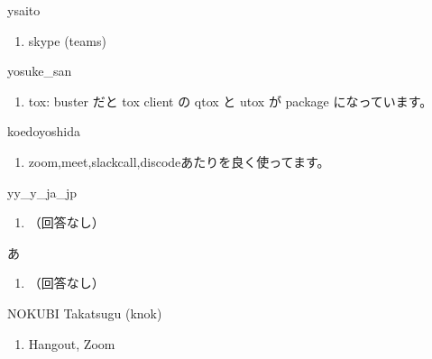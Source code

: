 \begin{prework}{ ysaito }
  \begin{enumerate}
  \item skype (teams)
  \end{enumerate}
\end{prework}

\begin{prework}{ yosuke\_san }
  \begin{enumerate}
  \item tox: buster だと tox client の qtox と utox が package になっています。
  \end{enumerate}
\end{prework}

\begin{prework}{ koedoyoshida }
  \begin{enumerate}
  \item zoom,meet,slackcall,discodeあたりを良く使ってます。
  \end{enumerate}
\end{prework}

\begin{prework}{ yy\_y\_ja\_jp }
  \begin{enumerate}
  \item （回答なし）
  \end{enumerate}
\end{prework}

\begin{prework}{ あ }
  \begin{enumerate}
  \item （回答なし）
  \end{enumerate}
\end{prework}

\begin{prework}{ NOKUBI Takatsugu (knok) }
  \begin{enumerate}
  \item Hangout, Zoom
  \end{enumerate}
\end{prework}
